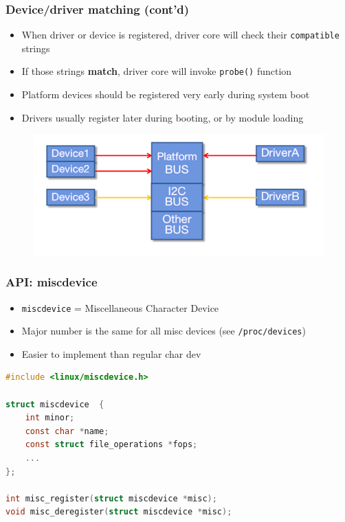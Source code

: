 \documentclass[aspectratio=169,usenames,dvipsnames]{beamer}
\newcounter{cont}
\begin{document}
\begin{frame}
  \frametitle{Device/driver matching (cont'd)}
  \begin{itemize}
    \item When driver or device is registered, driver core will check their
          \alert{\texttt{compatible}} strings
    \item If those strings \textbf{match}, driver core will invoke
          \texttt{probe()} function
    \item Platform devices should be registered very early during system boot
    \item Drivers usually register later during booting, or by module loading
  \end{itemize}
  \begin{figure}
    \centering
    \includegraphics[scale=1.8]{images/platform-bus.png}
  \end{figure}
  \vspace*{-10mm}
\end{frame}

\begin{frame}[containsverbatim]
  \frametitle{API: miscdevice}
  \begin{itemize}
    \item \texttt{miscdevice} = Miscellaneous Character Device
    \item Major number is the same for all misc devices (see
          \texttt{/proc/devices})
    \item Easier to implement than regular char dev
  \end{itemize}

  \begin{lstlisting}[language=c,numbers=none]
#include <linux/miscdevice.h>

struct miscdevice  {
	int minor;
	const char *name;
	const struct file_operations *fops;
	...
};

int misc_register(struct miscdevice *misc);
void misc_deregister(struct miscdevice *misc);
  \end{lstlisting}
\end{frame}
\end{document}
